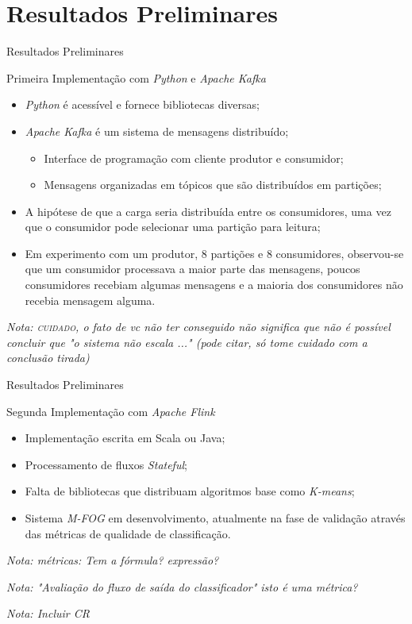 \documentclass[aspectratio=43,10pt]{beamer}
\newcommand{\nota}[1]{\hspace*{-0.5cm}\textit{{\color[rgb]{1,0,0}Nota: #1}}}
\begin{document}
\section{Resultados Preliminares}
\begin{frame}[fragile]{Resultados Preliminares}

  \begin{alertblock}{Primeira Implementação com \emph{Python} e \emph{Apache Kafka}}
    \begin{itemize}
      \item \emph{Python} é acessível e fornece bibliotecas diversas;
      \item \emph{Apache Kafka} é um sistema de mensagens distribuído;
      \begin{itemize}
        \item Interface de programação com cliente produtor e consumidor;
        \item Mensagens organizadas em tópicos que são distribuídos em partições;
      \end{itemize}
      \item A hipótese de que a carga seria distribuída entre os consumidores,
      uma vez que o consumidor pode selecionar uma partição para leitura;
      \item Em experimento com um produtor, 8 partições e 8 consumidores,
      observou-se que um consumidor processava a maior parte das mensagens,
      poucos consumidores recebiam algumas mensagens e a maioria dos consumidores
      não recebia mensagem alguma.
    \end{itemize}
  \end{alertblock}
\nota{\textsc{cuidado,} o fato de vc não ter conseguido não significa que não é possível\\
concluir que "o sistema não escala ..." (pode citar, só tome cuidado com a conclusão tirada)}
\end{frame}

\begin{frame}[fragile]{Resultados Preliminares}
  \begin{alertblock}{Segunda Implementação com \emph{Apache Flink}}
    \begin{itemize}
      \item Implementação escrita em Scala ou Java;
      \item Processamento de fluxos \emph{Stateful};
      \item Falta de bibliotecas que distribuam algoritmos base como \emph{K-means};
      \item Sistema \emph{M-FOG} em desenvolvimento, atualmente na fase de
      validação através das métricas de qualidade de classificação.
    \end{itemize}
  \end{alertblock}
\nota{métricas: Tem a fórmula? expressão?}

\nota{"Avaliação do fluxo de saída do classificador" isto é uma métrica?}

\nota{Incluir CR}
\end{frame}
\end{document}
